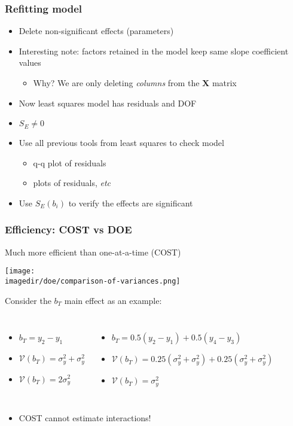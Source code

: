 \begin{frame}\frametitle{Refitting model}
	\begin{itemize}
		\item	Delete non-significant effects (parameters)
		\item	Interesting note: factors retained in the model keep same slope coefficient values
		\begin{itemize}
			\item	Why? We are only deleting \emph{columns} from the $\mathbf{X}$ matrix
		\end{itemize}
		\item	Now least squares model has residuals and DOF
		\item	$S_E \neq 0$
		\item	Use all previous tools from least squares to check model
		\begin{itemize}
			\item	q-q plot of residuals
			\item	plots of residuals, \emph{etc}
		\end{itemize}
		\item	Use $S_E(b_i)$ to verify the effects are significant
	\end{itemize}
\end{frame}

\begin{frame}\frametitle{Efficiency: COST vs DOE}
	\begin{block}{Much more efficient than one-at-a-time (COST)}
		\begin{center}
			\texttt{[image: \\imagedir/doe/comparison-of-variances.png]}
		\end{center}
	\end{block}
	Consider the $b_T$ main effect as an example:
	\begin{columns}
		\column{3.5cm}
			\begin{itemize}
				\item	$b_T = y_2 - y_1$
				\item	$\mathcal{V}(b_T) = \sigma_y^2 + \sigma_y^2$
				\item	$\mathcal{V}(b_T) = 2\sigma_y^2$
			\end{itemize}
		\column{7cm}
			\begin{itemize}
				\item	$b_T = 0.5(y_2 - y_1) + 0.5(y_4 - y_3)$
				\item	$\mathcal{V}(b_T) = 0.25(\sigma_y^2 + \sigma_y^2) + 0.25(\sigma_y^2 + \sigma_y^2)$
				\item	$\mathcal{V}(b_T) = \sigma_y^2$
			\end{itemize}
	\end{columns}
	\begin{itemize}
		\item	COST cannot estimate interactions!
	\end{itemize}
\end{frame}


